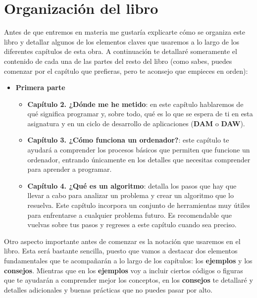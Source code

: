 \section{Organización del libro}

Antes de que entremos en materia me gustaría explicarte cómo se organiza este libro y detallar algunos de los elementos claves que
usaremos a lo largo de los diferentes capítulos de esta obra. A continuación te detallaré someramente el contenido de cada
una de las partes del resto del libro (como sabes, puedes comenzar por el capítulo que prefieras, pero te aconsejo que empieces 
en orden):

\begin{itemize}
    \item \textbf{Primera parte} {
        \begin{itemize}
            \item \textbf{Capítulo 2. ¿Dónde me he metido}: en este capítulo hablaremos de qué significa programar y, sobre todo, 
            qué es lo que se espera de ti en esta asignatura y en un ciclo de desarrollo de aplicaciones (\textbf{DAM} o \textbf{DAW}).
            \item \textbf{Capítulo 3. ¿Cómo funciona un ordenador?}: este capítulo te ayudará a comprender los procesos básicos que
            permiten que funcione un ordenador, entrando únicamente en los detalles que necesitas comprender para aprender a programar.
            \item \textbf{Capítulo 4. ¿Qué es un algoritmo}: detalla los pasos que hay que llevar a cabo para analizar un problema y
            crear un algoritmo que lo resuelva. Este capítulo incorpora un conjunto de herramientas muy útiles para enfrentarse a
            cualquier problema futuro. Es recomendable que vuelvas sobre tus pasos y regreses a este capítulo cuando sea preciso.
        \end{itemize}
        }

\end{itemize}

Otro aspecto importante antes de comenzar es la notación que usaremos en el libro. Esta será bastante sencilla, puesto que vamos
a destacar dos elementos fundamentales que te acompañarán a lo largo de los capítulos: los \textbf{ejemplos} y los \textbf{consejos}. Mientras que
en los \textbf{ejemplos} voy a incluir ciertos códigos o figuras que te ayudarán a comprender mejor los conceptos, en los \textbf{consejos} te detallaré
y detalles adicionales y buenas prácticas que no puedes pasar por alto.

